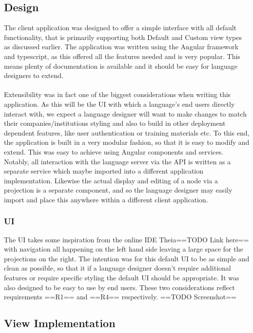\documentclass{article}
\begin{document}
\subsection{Design}
The client application was designed to offer a simple interface with all default functionality, that is primarily  supporting both Default and Custom view types as discussed earlier. The application was written using the Angular framework and typescript, as this offered all the features needed and is very popular. This means plenty of documentation is available and it should be easy for language designers to extend.
\\
\\
Extensibility was in fact one of the biggest considerations when writing this application. As this will be the UI with which a language's end users directly interact with, we expect a language designer will want to make changes to match their companies/institutions styling and also to build in other  deployment dependent features, like user authentication or training materials etc. To this end, the application is built in a very modular fashion, so that it is easy to modify and extend. This was easy to achieve using Angular components and services. Notably, all interaction with the language server via the API is written as a separate service which maybe imported into a different application implementation. Likewise the actual display and editing of a node via a projection is a separate component, and so the language designer may easily import and place this anywhere within a different client application.
\subsubsection{UI}
The UI takes some inspiration from the online IDE Theia==TODO Link here== with navigation all happening on the left hand side leaving a large space for the projections on the right. The intention was for this default UI to be as simple and clean as possible, so that it if a language designer doesn't require additional features or require specific styling the default UI should be appropriate. It was also designed to be easy to use by end users. These two considerations reflect requirements ==R1== and ==R4== respectively.
==TODO Screenshot==


\subsection{View Implementation}
\end{document}

